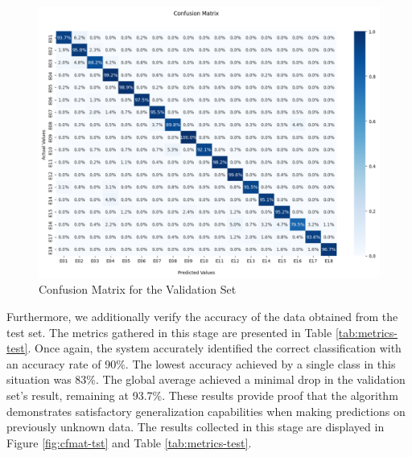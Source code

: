 \begin{figure}[h!]
    \centering
    \includegraphics[width=\linewidth]{Figures/validation.png}
    \caption{Confusion Matrix for the Validation Set}
    \label{fig:cfmat-val}
\end{figure}

Furthermore, we additionally verify the accuracy of the data obtained from the test set. The metrics gathered in this stage are presented in Table \ref{tab:metrics-test}. Once again, the system accurately identified the correct classification with an accuracy rate of 90\%. The lowest accuracy achieved by a single class in this situation was 83\%. The global average achieved a minimal drop in the validation set's result, remaining at 93.7\%. These results provide proof that the algorithm demonstrates satisfactory generalization capabilities when making predictions on previously unknown data. The results collected in this stage are displayed in Figure \ref{fig:cfmat-tst} and Table \ref{tab:metrics-test}.

